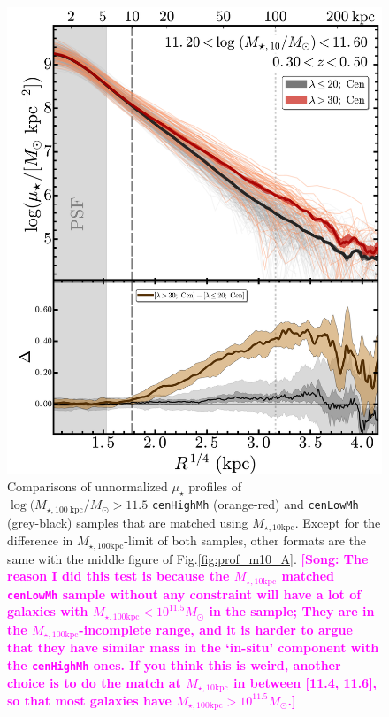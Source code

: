 \documentclass{emulateapj}
\def\rbcg{\texttt{cenHighMh}}
\def\nbcg{\texttt{cenLowMh}}
\def\minn{{$M_{\star,10\mathrm{kpc}}$}}
\def\mtot{{$M_{\star,100\mathrm{kpc}}$}}
\def\mden{{$\mu_{\star}$}}
\newcommand{\song}[1]{\textcolor{magenta}{\textbf{[Song: #1]}}}
\begin{document}
\begin{CJK*}{UTF8}{gbsn}
  \begin{figure}[bt!]
      \centering 
      \includegraphics[width=\columnwidth]{fig/redbcg_prof_m10B}
      \caption{Comparisons of unnormalized \mden{} profiles of 
      	  $\log (M_{\star,100\ \mathrm{kpc}}/M_{\odot}>11.5$ \rbcg{} (orange-red) 
      	  and \nbcg{} (grey-black) samples that are matched using \minn{}.
          Except for the difference in \mtot{}-limit of both samples, other formats are 
          the same with the middle figure of Fig.\ref{fig:prof_m10_A}.
          \song{The reason I did this test is because the \minn{} matched \nbcg{} 
          sample without any constraint will have a lot of galaxies with 
          \mtot{}$<10^{11.5} M_{\odot}$ in the sample; They are in the 
          \mtot{}-incomplete range, and it is harder to argue that they have similar 
          mass in the `in-situ' component with the \rbcg{} ones. 
          If you think this is weird, another choice is to do the match at \minn{} in 
          between [11.4, 11.6], so that most galaxies have 
          \mtot{}$>10^{11.5} M_{\odot}$.}}
      \label{fig:prof_m10_B}
  \end{figure}


\end{CJK*}
\end{document}
